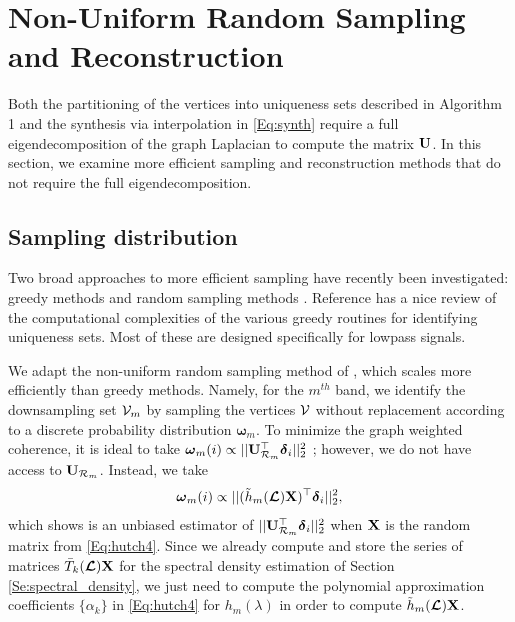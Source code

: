 \documentclass[journal, 10pt]{IEEEtran}
\begin{document}




\section{Non-Uniform Random Sampling and Reconstruction}
Both the partitioning of the vertices into uniqueness sets described in Algorithm 1 and the synthesis via interpolation in \eqref{Eq:synth} require a full eigendecomposition of the graph Laplacian to compute the matrix ${\bf U}$. In this section, we examine more efficient sampling and reconstruction methods that do not require the full eigendecomposition.


\subsection{Sampling distribution}
Two broad approaches to more efficient sampling have recently been investigated: greedy methods \cite{chen2015discrete,anis2014towards,tsitsvero2016uncertainty,anis2016efficient} and random sampling methods \cite{shomorony,PuyTGV15,chen2016signal}. Reference \cite{anis2016efficient} has a nice review of the computational complexities of the various greedy routines for identifying uniqueness sets. Most of these are designed specifically for lowpass signals. 
 
We adapt the non-uniform random sampling method of \cite{PuyTGV15}, which scales more efficiently than greedy methods. Namely, for the $m^{th}$ band, we identify the downsampling set ${\mathcal{V}}_m$ by sampling the vertices ${\mathcal{V}}$ {\color{red} without replacement} according to a discrete probability distribution ${\boldsymbol \omega}_m$. To minimize the graph weighted coherence, it is ideal to take ${\boldsymbol \omega}_m(i) \propto ||{\bf U}_{{\cal R}_m}^{\top} {\boldsymbol \delta}_i ||_2^2$ \cite{PuyTGV15}; however, we do not have access to ${\bf U}_{{\cal R}_m}$. Instead, we take 
\begin{align}\label{Eq:samp_dist}
{\boldsymbol \omega}_m(i) \propto ||(\tilde{h}_m(\L){\bf X})^{\top} {\boldsymbol \delta}_i ||_2^2,
\end{align}
which \cite{PuyTGV15} shows is an unbiased estimator of $||{\bf U}_{{\cal R}_m}^{\top} {\boldsymbol \delta}_i ||_2^2$ when ${\bf X}$ is the random matrix from \eqref{Eq:hutch4}. Since we already compute and store the series of matrices $\bar{T}_k(\boldsymbol{\mathcal{L}}){\bf X}$ for the spectral density estimation of Section \ref{Se:spectral_density}, we just need to compute the polynomial approximation coefficients $\{\alpha_k\}$ in \eqref{Eq:hutch4} for $h_m(\lambda)$ in order to compute $\tilde{h}_m(\boldsymbol{\mathcal{L}}){\bf X}$.
\end{document}
